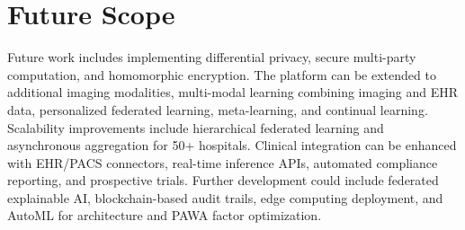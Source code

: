 \section{Future Scope}

Future work includes implementing differential privacy, secure multi-party computation, and homomorphic encryption. The platform can be extended to additional imaging modalities, multi-modal learning combining imaging and EHR data, personalized federated learning, meta-learning, and continual learning. Scalability improvements include hierarchical federated learning and asynchronous aggregation for 50+ hospitals. Clinical integration can be enhanced with EHR/PACS connectors, real-time inference APIs, automated compliance reporting, and prospective trials. Further development could include federated explainable AI, blockchain-based audit trails, edge computing deployment, and AutoML for architecture and PAWA factor optimization.
